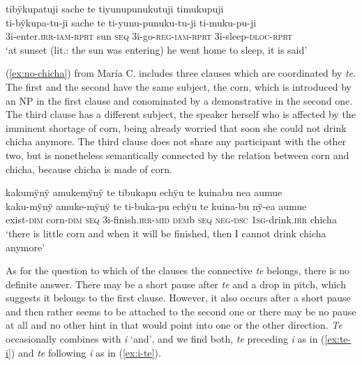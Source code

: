 \ea\label{ex:sunset}
\begingl
\glpreamble tibÿkupatuji sache te tiyunupunukutuji timukupuji\\
\gla ti-bÿkupa-tu-ji sache te ti-yunu-punuku-tu-ji ti-muku-pu-ji\\
\glb 3i-enter.\textsc{irr}-\textsc{iam}-\textsc{rprt} sun \textsc{seq} 3i-go-\textsc{reg}-\textsc{iam}-\textsc{rprt} 3i-sleep-\textsc{dloc}-\textsc{rprt}\\
\glft ‘at sunset (lit.: the sun was entering) he went home to sleep, it is said’
\endgl
\trailingcitation{[mox-n110920l.043]}
\xe


(\ref{ex:no-chicha}) from María C. includes three clauses which are coordinated by \textit{te}. The first and the second have the same subject, the corn, which is introduced by an NP in the first clause and conominated by a demonstrative in the second one. The third clause has a different subject, the speaker herself who is affected by the imminent shortage of corn, being already worried that soon she could not drink chicha anymore. The third clause does not share any participant with the other two, but is nonetheless semantically connected by the relation between corn and chicha, because chicha is made of corn.

\largerpage
\ea\label{ex:no-chicha}
\begingl
\glpreamble kakumÿnÿ amukemÿnÿ te tibukapu echÿu te kuinabu nea aumue\\
\gla kaku-mÿnÿ amuke-mÿnÿ te ti-buka-pu echÿu te kuina-bu nÿ-ea aumue\\
\glb exist-\textsc{dim} corn-\textsc{dim} \textsc{seq} 3i-finish.\textsc{irr}-\textsc{mid} \textsc{dem}b \textsc{seq} \textsc{neg}-\textsc{dsc} 1\textsc{sg}-drink.\textsc{irr} chicha\\
\glft ‘there is little corn and when it will be finished, then I cannot drink chicha anymore’
\endgl
\trailingcitation{[ump-p110815sf.693]}
\xe

As for the question to which of the clauses the connective \textit{te} belongs, there is no definite answer. There may be a short pause after \textit{te} and a drop in pitch, which suggests it belongs to the first clause. However, it also occurs after a short pause and then rather seems to be attached to the second one or there may be no pause at all and no other hint in  that would point into one or the other direction. \textit{Te} occasionally combines with \textit{i} ‘and’, and we find both, \textit{te} preceding \textit{i} as in (\ref{ex:te-i}) and \textit{te} following \textit{i} as in (\ref{ex:i-te}).

